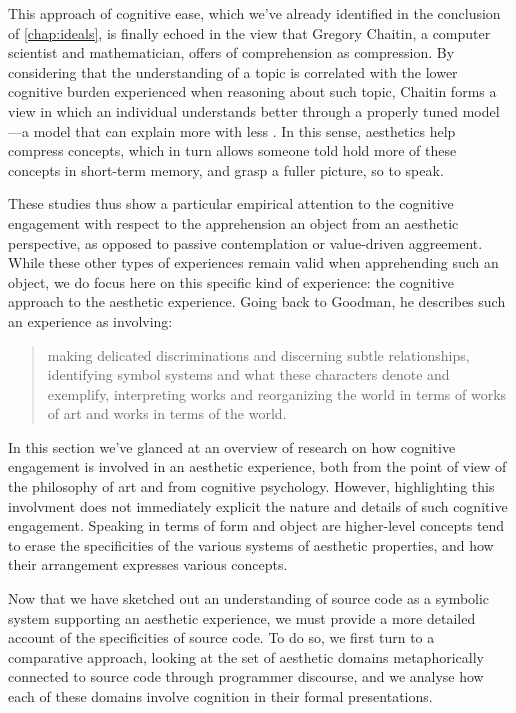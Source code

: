 This approach of cognitive ease, which we've already identified in the conclusion of \ref{chap:ideals}, is finally echoed in the view that Gregory Chaitin, a computer scientist and mathematician, offers of comprehension as compression. By considering that the understanding of a topic is correlated with the lower cognitive burden experienced when reasoning about such topic, Chaitin forms a view in which an individual understands better through a properly tuned model—a model that can explain more with less \citep{zenil_compression_2021}. In this sense, aesthetics help compress concepts, which in turn allows someone told hold more of these concepts in short-term memory, and grasp a fuller picture, so to speak.

These studies thus show a particular empirical attention to the cognitive engagement with respect to the apprehension an object from an aesthetic perspective, as opposed to passive contemplation or value-driven aggreement. While these other types of experiences remain valid when apprehending such an object, we do focus here on this specific kind of experience: the cognitive approach to the aesthetic experience. Going back to Goodman, he describes such an experience as involving:

\begin{quote}
    making delicated discriminations and discerning subtle relationships, identifying symbol systems and what these characters denote and exemplify, interpreting works and reorganizing the world in terms of works of art and works in terms of the world. \citep{goodman_languages_1976}
\end{quote}

\spacersmall

In this section we've glanced at an overview of research on how cognitive engagement is involved in an aesthetic experience, both from the point of view of the philosophy of art and from cognitive psychology. However, highlighting this involvment does not immediately explicit the nature and details of such cognitive engagement. Speaking in terms of form and object are higher-level concepts tend to erase the specificities of the various systems of aesthetic properties, and how their arrangement expresses various concepts.

Now that we have sketched out an understanding of source code as a symbolic system supporting an aesthetic experience, we must provide a more detailed account of the specificities of source code. To do so, we first turn to a comparative approach, looking at the set of aesthetic domains metaphorically connected to source code through programmer discourse, and we analyse how each of these domains involve cognition in their formal presentations.

